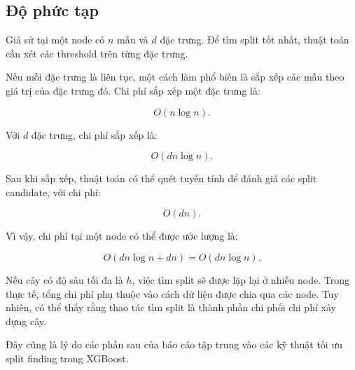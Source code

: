 \subsection{Độ phức tạp}

Giả sử tại một node có $n$ mẫu và $d$ đặc trưng. Để tìm split tốt nhất, thuật toán cần xét các threshold trên từng đặc trưng.

Nếu mỗi đặc trưng là liên tục, một cách làm phổ biến là sắp xếp các mẫu theo giá trị của đặc trưng đó. Chi phí sắp xếp một đặc trưng là:

\[
O(n \log n).
\]

Với $d$ đặc trưng, chi phí sắp xếp là:

\[
O(dn \log n).
\]

Sau khi sắp xếp, thuật toán có thể quét tuyến tính để đánh giá các split candidate, với chi phí:

\[
O(dn).
\]

Vì vậy, chi phí tại một node có thể được ước lượng là:

\[
O(dn \log n + dn) = O(dn \log n).
\]

Nếu cây có độ sâu tối đa là $h$, việc tìm split sẽ được lặp lại ở nhiều node. Trong thực tế, tổng chi phí phụ thuộc vào cách dữ liệu được chia qua các node. Tuy nhiên, có thể thấy rằng thao tác tìm split là thành phần chi phối chi phí xây dựng cây.

Đây cũng là lý do các phần sau của báo cáo tập trung vào các kỹ thuật tối ưu split finding trong XGBoost.
